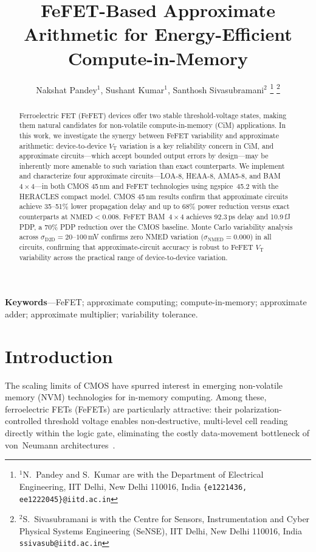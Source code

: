 \documentclass[letterpaper, 10 pt, conference]{ieeeconf}  %
\title{\LARGE \bf
FeFET-Based Approximate Arithmetic for Energy-Efficient
Compute-in-Memory%
}
\author{Nakshat Pandey$^{1}$, Sushant Kumar$^{1}$, Santhosh Sivasubramani$^{2}$%
\thanks{$^{1}$N.~Pandey and S.~Kumar are with the Department of Electrical
        Engineering, IIT Delhi, New Delhi 110016, India
        {\tt\small \{e1221436, ee1222045\}@iitd.ac.in}}%
\thanks{$^{2}$S.~Sivasubramani is with the Centre for Sensors, Instrumentation
        and Cyber Physical Systems Engineering (SeNSE), IIT Delhi, New Delhi
        110016, India
        {\tt\small ssivasub@iitd.ac.in}}%
}
\newcommand{\VT}{V_{\mathrm{T}}}
\newcommand{\NMED}{\mathrm{NMED}}
\newcommand{\sigDD}{\sigma_{\mathrm{D2D}}}
\newcommand{\sigNMED}{\sigma_{\mathrm{NMED}}}
\begin{document}
\maketitle
\thispagestyle{empty}
\pagestyle{empty}


\begin{abstract}

Ferroelectric FET (FeFET) devices offer two stable threshold-voltage states,
making them natural candidates for non-volatile compute-in-memory (CiM)
applications. In this work, we investigate the synergy between FeFET
variability and approximate arithmetic: device-to-device $\VT$ variation is a
key reliability concern in CiM, and approximate circuits---which accept bounded
output errors by design---may be inherently more amenable to such variation
than exact counterparts. We implement and characterize four approximate
circuits---LOA-8, HEAA-8, AMA5-8, and BAM~$4\times4$---in both CMOS 45\,nm
and FeFET technologies using ngspice~45.2 with the HERACLES compact model.
CMOS 45\,nm results confirm that approximate circuits achieve 35--51\% lower
propagation delay and up to 68\% power reduction versus exact counterparts at
$\NMED < 0.008$. FeFET BAM~$4\times4$ achieves 92.3\,ps delay and 10.9\,fJ
PDP, a 70\% PDP reduction over the CMOS baseline. Monte Carlo variability
analysis across $\sigDD = 20$--$100$\,mV confirms zero NMED variation
($\sigNMED = 0.000$) in all circuits, confirming that approximate-circuit
accuracy is robust to FeFET $\VT$ variability across the practical range of
device-to-device variation.

\end{abstract}

\smallskip\noindent\textbf{Keywords}---FeFET; approximate computing;
compute-in-memory; approximate adder; approximate multiplier; variability
tolerance.


\section{Introduction}

The scaling limits of CMOS have spurred interest in emerging non-volatile
memory (NVM) technologies for in-memory computing. Among these, ferroelectric
FETs (FeFETs) are particularly attractive: their polarization-controlled
threshold voltage enables non-destructive, multi-level cell reading directly
within the logic gate, eliminating the costly data-movement bottleneck of
von~Neumann architectures~\cite{jerry2017fefet}.
\end{document}
